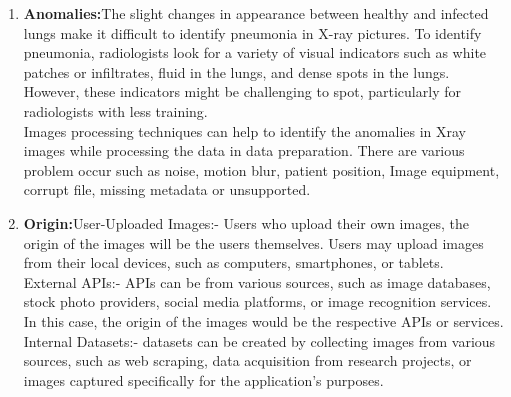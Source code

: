 \begin{enumerate}
	\item \textbf{Anomalies:}The slight changes in appearance between healthy and infected lungs make it difficult to identify pneumonia in X-ray pictures. To identify pneumonia, radiologists look for a variety of visual indicators such as white patches or infiltrates, fluid in the lungs, and dense spots in the lungs. However, these indicators might be challenging to spot, particularly for radiologists with less training. \\
	Images processing techniques can help to identify the anomalies in Xray images while processing the data in data preparation. There are various problem occur such as noise, motion blur, patient position, Image equipment, corrupt file, missing metadata or unsupported.\\
	
	\item \textbf{Origin:}User-Uploaded Images:- Users who upload their own images, the origin of the images will be the users themselves. Users may upload images from their local devices, such as computers, smartphones, or tablets.\\
	External APIs:- APIs can be from various sources, such as image databases, stock photo providers, social media platforms, or image recognition services. In this case, the origin of the images would be the respective APIs or services.\\
	Internal Datasets:- datasets can be created by collecting images from various sources, such as web scraping, data acquisition from research projects, or images captured specifically for the application's purposes.\\
	
	
\end{enumerate}


